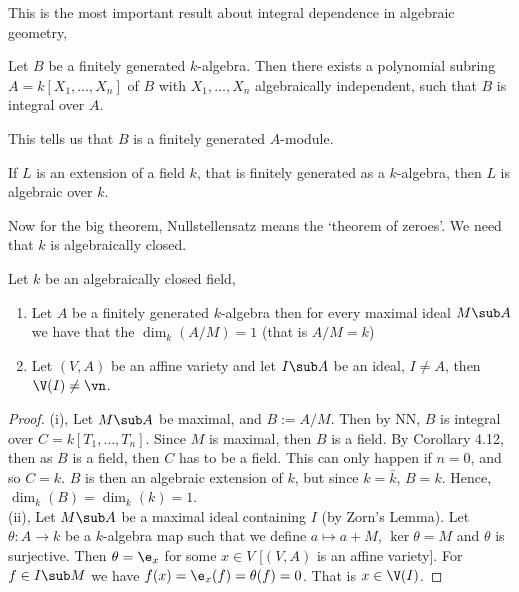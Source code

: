 \noindent
This is the most important result about integral dependence in algebraic geometry,
\begin{nprop}
  Let $B$ be a finitely generated $k$-algebra. Then there exists a polynomial subring $A = k[X_1, \dots, X_n]$ of $B$ with $X_1, \dots, X_n$ algebraically independent, such that $B$ is integral over $A$.
\end{nprop}
\noindent
This tells us that $B$ is a finitely generated $A$-module.

\begin{ncor}
  If $L$ is an extension of a field $k$, that is finitely generated as a $k$-algebra, then $L$ is algebraic over $k$.
\end{ncor}

\noindent
Now for the big theorem, Nullstellensatz means the `theorem of zeroes'. We need that $k$ is algebraically closed.
\begin{nthm}
  Let $k$ be an algebraically closed field,
  \begin{enumerate}
    \item Let $A$ be a finitely generated $k$-algebra then for every maximal ideal $M\sub A$ we have that the $\dim_k (A / M) = 1$ (that is $A/M = k$)
    \item Let $(V, A)$ be an affine variety and let $I \sub A$ be an ideal, $I \ne A$, then $\V(I) \ne \vn$.
  \end{enumerate}
\end{nthm}
\begin{proof}
  (i), Let $M \sub A$ be maximal, and $B := A/M$. Then by NN, $B$ is integral over $C = k[T_1, \dots, T_n]$. Since $M$ is maximal, then $B$ is a field.  By Corollary 4.12, then as $B$ is a field, then $C$ has to be a field. This can only happen if $n = 0$, and so $C = k$. $B$ is then an algebraic extension of $k$, but since $k = \bar k$, $B = k$. Hence, $\dim_k (B) = \dim_k (k) = 1$.\\

  \noindent
  (ii), Let $M \sub A$ be a maximal ideal containing $I$ (by Zorn's Lemma). Let $\theta : A \to k$ be a $k$-algebra map such that we define $a \mapsto a + M$, $\ker \theta = M$ and $\theta$ is surjective. Then $\theta = \e_x$ for some $x \in V$ [$(V, A)$ is an affine variety]. For $f \in I \sub M$ we have $f(x) = \e_x (f) = \theta(f) = 0$. That is $x \in \V(I)$.
\end{proof}

